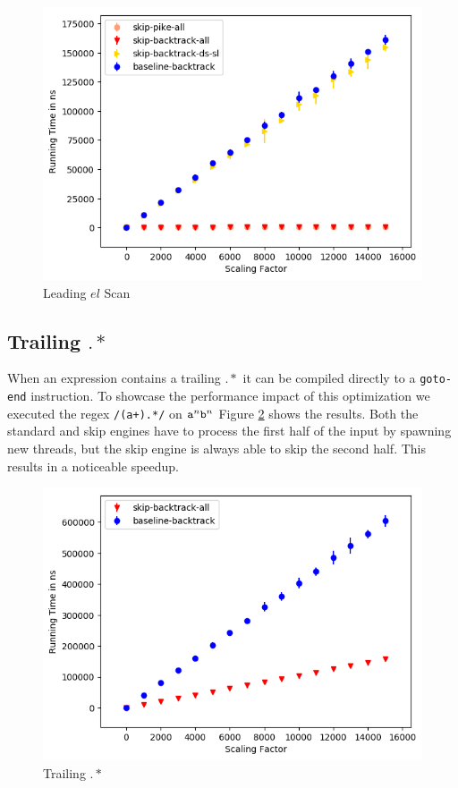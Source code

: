 \begin{figure}
\caption{Leading $el$ Scan}
\label{fig:leading:noncontaining:estar}

\includegraphics{resources/leading-estar.png}
\end{figure}

\subsection{Trailing $.*$}

When an expression contains a trailing $.*$ it can be compiled
directly to a \verb'goto-end' instruction. To showcase the
performance impact of this optimization we executed the
regex \verb'/(a+).*/' on ${\tt a}^n{\tt b}^n$
Figure \ref{fig:aplus:trailing} shows the results. Both the standard
and skip engines have to process the first half of the input
by spawning new threads, but the skip engine is always able
to skip the second half. This results in a noticeable speedup.

\begin{figure}
\caption{Trailing $.*$}
\label{fig:aplus:trailing}

\includegraphics{resources/aplus-trailing.png}
\end{figure}

